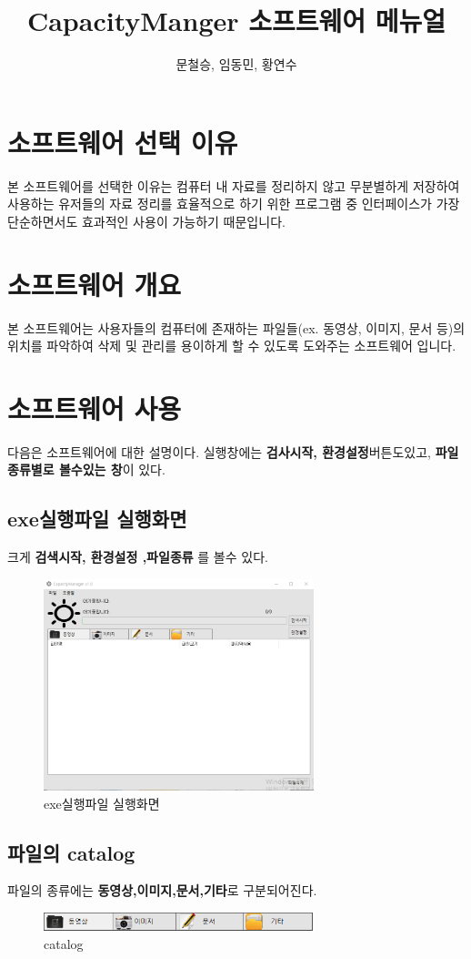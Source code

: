 \documentclass[a4paper, 13pt]{article} %
\title{CapacityManger 소프트웨어 메뉴얼}
\author{문철승, 임동민, 황연수}
\begin{document}
	
	\LARGE \maketitle
	
	\clearpage
	
	\normalsize
	\section{소프트웨어 선택 이유}
	본 소프트웨어를 선택한 이유는 컴퓨터 내 자료를 정리하지 않고 무분별하게 저장하여 사용하는 유저들의 자료 정리를 효율적으로 하기 위한 프로그램 중 인터페이스가 가장 단순하면서도 효과적인 사용이 가능하기 때문입니다.
	\section{소프트웨어 개요}
	본 소프트웨어는 사용자들의 컴퓨터에 존재하는 파일들(ex. 동영상, 이미지, 문서 등)의 위치를 파악하여 삭제 및 관리를 용이하게 할 수 있도록 도와주는 소프트웨어 입니다.
	\section{소프트웨어 사용}
	다음은 소프트웨어에 대한 설명이다.  실행창에는  \textbf{검사시작, 환경설정}버튼도있고,  \textbf{파일종류별로 볼수있는 창}이 있다.
		\subsection{exe실행파일 실행화면}
		크게 \textbf{검색시작, 환경설정 ,파일종류 }를 볼수 있다.
	\begin{figure}[h]
		\centering
		\includegraphics[width=0.7\textwidth]{Figures/exe2}
		\caption{exe실행파일 실행화면}
		\label{fig:exe2}
	\end{figure}

		\subsection{파일의 catalog}
		파일의 종류에는 \textbf{동영상,이미지,문서,기타}로 구분되어진다.
	\begin{figure}[h]
		\centering
		\includegraphics[width=0.7\textwidth]{Figures/catalog}
		\caption{catalog }
		\label{fig:catalog}
	\end{figure}
\end{document}
